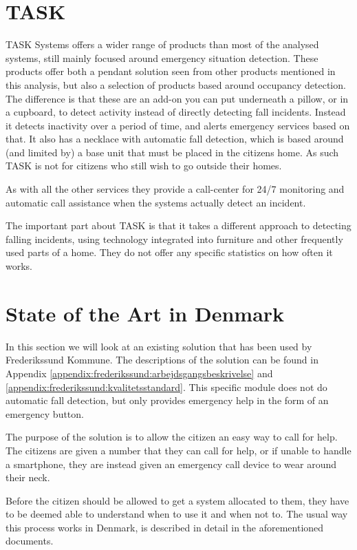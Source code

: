 \section{TASK}
TASK Systems offers a wider range of products than most of the analysed systems, still mainly focused around emergency situation detection. These products offer both a pendant solution seen from other products mentioned in this analysis, but also a selection of products based around occupancy detection. The difference is that these are an add-on you can put underneath a pillow, or in a cupboard, to detect activity instead of directly detecting fall incidents. Instead it detects inactivity over a period of time, and alerts emergency services based on that. It also has a necklace with automatic fall detection, which is based around (and limited by) a base unit that must be placed in the citizens home. As such TASK is not for citizens who still wish to go outside their homes.

As with all the other services they provide a call-center for 24/7 monitoring and automatic call assistance when the systems actually detect an incident.

The important part about TASK is that it takes a different approach to detecting falling incidents, using technology integrated into furniture and other frequently used parts of a home. They do not offer any specific statistics on how often it works. 

\section{State of the Art in Denmark}
In this section we will look at an existing solution that has been used by Frederikssund Kommune. The descriptions of the solution can be found in Appendix \ref{appendix:frederikssund:arbejdsgangsbeskrivelse} and \ref{appendix:frederikssund:kvalitetsstandard}. This specific module does not do automatic fall detection, but only provides emergency help in the form of an emergency button.

The purpose of the solution is to allow the citizen an easy way to call for help. The citizens are given a number that they can call for help, or if unable to handle a smartphone, they are instead given an emergency call device to wear around their neck.

Before the citizen should be allowed to get a system allocated to them, they have to be deemed able to understand when to use it and when not to. The usual way this process works in Denmark, is described in detail in the aforementioned documents.

